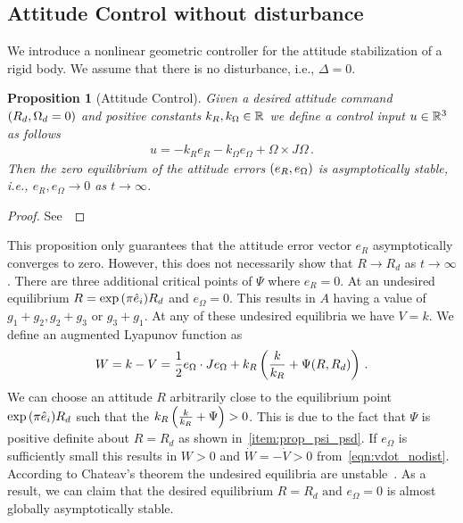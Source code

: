 \documentclass[letterpaper, 10 pt, conference]{ieeeconf}  %
\newtheorem{prop}{Proposition}
\begin{document}
\subsection{Attitude Control without disturbance}
We introduce a nonlinear geometric controller for the attitude stabilization of a rigid body.
We assume that there is no disturbance, i.e., \( \Delta = 0 \).
\begin{prop}[Attitude Control]\label{prop:att_control}
	Given a desired attitude command \( \left( R_d, \Omega_d = 0 \right) \) and positive constants \( k_R, k_\Omega \in \mathbb{R} \) we define a control input \( u \in \mathbb{R}^3 \) as follows
	\begin{gather}
		u = -k_R e_R - k_\Omega e_\Omega + \Omega \times J \Omega \, . \label{eqn:nodist_control}
	\end{gather}
	Then the zero equilibrium of the attitude errors \( \left( e_R, e_\Omega \right) \) is asymptotically stable, i.e., \(e_R, e_\Omega \to 0 \) as \( t \to \infty \).
\end{prop}

\begin{proof}
See~
\end{proof}

This proposition only guarantees that the attitude error vector \( e_R \) asymptotically converges to zero.
However, this does not necessarily show that \( R \to R_d \) as \( t \to \infty \). 
There are three additional critical points of \( \Psi \) where \( e_R = 0 \).
At an undesired equilibrium \( R = \exp{ \ensuremath{\left( \pi \hat{e}_i \right)}} R_d \) and \( e_\Omega =0 \). 
This results in \( A \) having a value of \( g_1 + g_2, g_2 + g_3 \) or \( g_3 + g_1 \).
At any of these undesired equilibria we have \( V = k \). 
We define an augmented Lyapunov function as
\begin{align*}
	W = k - V = \frac{1}{2} e_\Omega \cdot J e_\Omega + k_R \left( \frac{k}{k_R}+ \Psi(R,R_d) \right) \, .
\end{align*}
We can choose an attitude \( R \) arbitrarily close to the equilibrium point \( \exp{ \ensuremath{\left( \pi \hat{e}_i \right)}} R_d \) such that the \( k_R \left( \frac{k}{k_R}+\Psi  \right)> 0 \).
This is due to the fact that \( \Psi \) is positive definite about \( R = R_d \) as shown in~\cref{item:prop_psi_psd}.
If \( e_\Omega \) is sufficiently small this results in \( W > 0 \) and \( \dot{W} = -\dot{V} > 0\) from~\cref{eqn:vdot_nodist}.
According to Chateav's theorem the undesired equilibria are unstable~\cite{khalil1996}.
As a result, we can claim that the desired equilibrium \( R = R_d \text{ and } e_\Omega = 0 \) is almost globally asymptotically stable.
\end{document}
